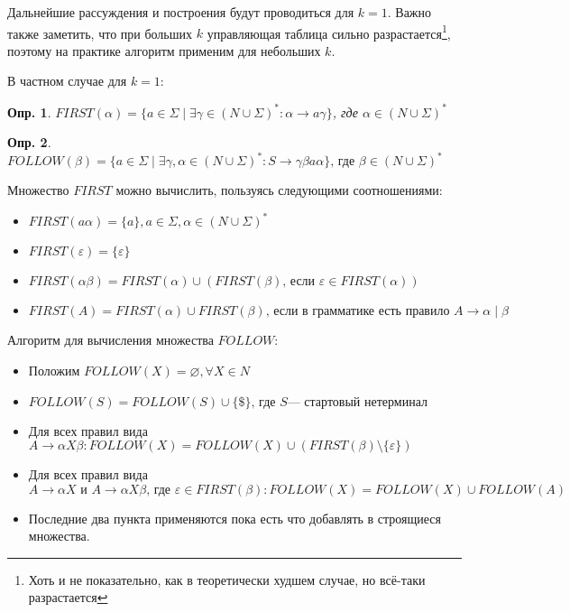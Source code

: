 \documentclass[10pt]{article}         %
\newtheorem{definition}{Опр.}
\begin{document}
    Дальнейшие рассуждения и построения будут проводиться для $k=1$. Важно также заметить, что при больших $k$ управляющая таблица сильно разрастается\footnote{Хоть и не показательно, как в теоретически худшем случае, но всё-таки разрастается}, поэтому на практике алгоритм применим для небольших $k$.
	
	
	В частном случае для $k = 1$:
	\begin{definition}
	$ FIRST(\alpha) = \{ a \in \Sigma \mid \exists \gamma \in (N \cup \Sigma)^*: \alpha \to a \gamma \} $, где $ \alpha \in (N \cup \Sigma)^* $
	\end{definition}
	\begin{definition}
	$ FOLLOW(\beta) = \{ a \in \Sigma \mid \exists \gamma, \alpha \in (N \cup \Sigma)^* : S \to \gamma \beta a \alpha \} \text{, где } \beta \in (N \cup \Sigma)^*  $
	\end{definition}
	Множество $FIRST$ можно вычислить, пользуясь следующими соотношениями:
	
	\begin{itemize}
		\item $FIRST(a \alpha) = \{a\}, a \in \Sigma, \alpha \in (N \cup \Sigma)^* $
		\item $FIRST(\varepsilon) = \{\varepsilon\}$
		\item $FIRST(\alpha \beta) = FIRST(\alpha) \cup (FIRST(\beta) \text{, если } \varepsilon \in FIRST(\alpha))$
		\item $FIRST(A) = FIRST(\alpha) \cup FIRST(\beta) \text{, если в грамматике есть правило } A \to \alpha \mid\beta$
	\end{itemize}
	
	Алгоритм для вычисления множества $FOLLOW$:
	\begin{algorithm}
	\begin{itemize}
		\item Положим $FOLLOW(X) = \varnothing, \forall X \in N$
		\item $FOLLOW(S) = FOLLOW(S) \cup \{\$\} \text{, где } S \text{--- стартовый нетерминал}$
		\item Для всех правил вида $A \to \alpha X \beta: FOLLOW(X) = FOLLOW(X) \cup (FIRST(\beta) \setminus \{\varepsilon\} )$
		\item Для всех правил вида $A \to \alpha X \text{ и } A \to \alpha X \beta \text{, где } \varepsilon \in FIRST(\beta): FOLLOW(X) = FOLLOW(X) \cup FOLLOW(A)$
		\item Последние два пункта применяются пока есть что добавлять в строящиеся множества.
	\end{itemize}
	\end{algorithm}	
	
\end{document}
